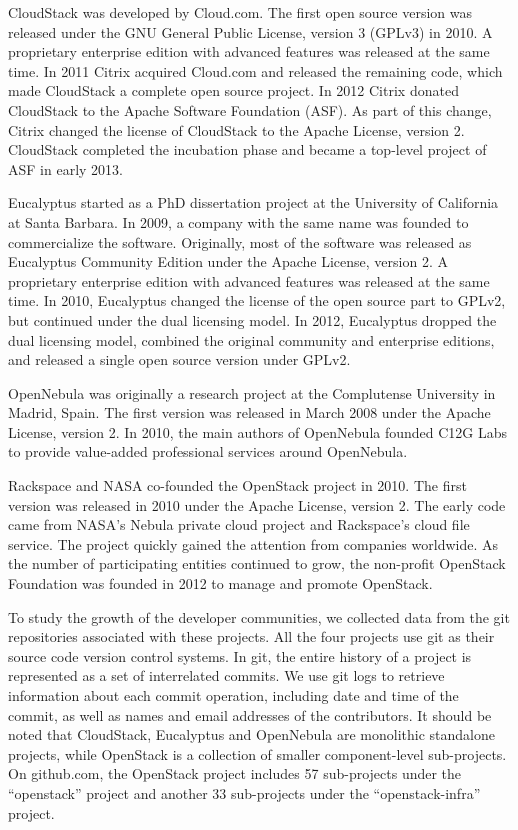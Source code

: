 \documentclass[conference]{IEEEtran}
\begin{document}
CloudStack was developed by Cloud.com. The first open source version was released under the GNU General Public License, version 3 (GPLv3) in 2010. A proprietary enterprise edition with advanced features was released at the same time. In 2011 Citrix acquired Cloud.com and released the remaining code, which made CloudStack a complete open source project. In 2012 Citrix donated CloudStack to the Apache Software Foundation (ASF). As part of this change, Citrix changed the license of CloudStack to the Apache License, version 2. CloudStack completed the incubation phase and became a top-level project of ASF in early 2013.

Eucalyptus \cite{c1} started as a PhD dissertation project at the University of California at Santa Barbara. In 2009, a company with the same name was founded to commercialize the software. Originally, most of the software was released as Eucalyptus Community Edition under the Apache License, version 2. A proprietary enterprise edition with advanced features was released at the same time. In 2010, Eucalyptus changed the license of the open source part to GPLv2, but continued under the dual licensing model. In 2012, Eucalyptus dropped the dual licensing model, combined the original community and enterprise editions, and released a single open source version under GPLv2.

OpenNebula \cite{c2} was originally a research project at the Complutense University in Madrid, Spain. The first version was released in March 2008 under the Apache License, version 2. In 2010, the main authors of OpenNebula founded C12G Labs to provide value-added professional services around OpenNebula.

Rackspace and NASA co-founded the OpenStack project in 2010. The first version was released in 2010 under the Apache License, version 2. The early code came from NASA’s Nebula private cloud project \cite{c3}\cite{c4} and Rackspace’s cloud file service. The project quickly gained the attention from companies worldwide. As the number of participating entities continued to grow, the non-profit OpenStack Foundation was founded in 2012 to manage and promote OpenStack.

To study the growth of the developer communities, we collected data from the git repositories associated with these projects. All the four projects use git as their source code version control systems. In git, the entire history of a project is represented as a set of interrelated commits. We use git logs to retrieve information about each commit operation, including date and time of the commit, as well as names and email addresses of the contributors. It should be noted that CloudStack, Eucalyptus and OpenNebula are monolithic standalone projects, while OpenStack is a collection of smaller component-level sub-projects. On github.com, the OpenStack project includes 57 sub-projects under the “openstack” project and another 33 sub-projects under the “openstack-infra” project. 
\end{document}
